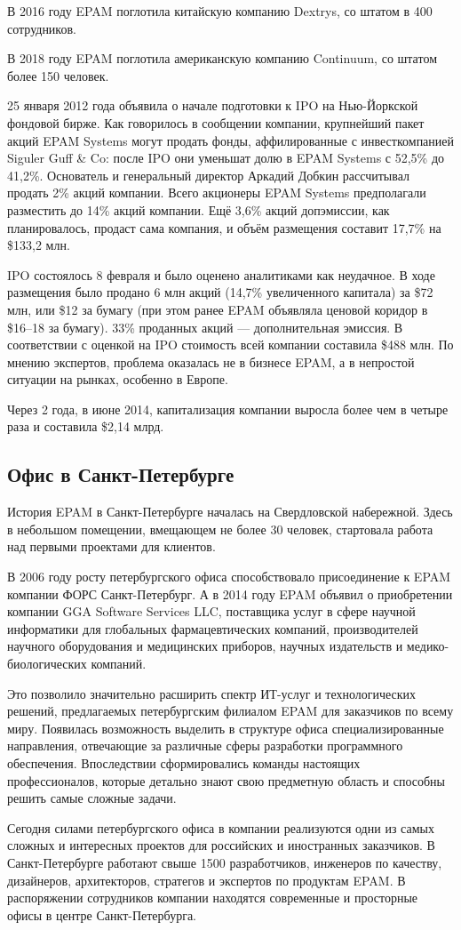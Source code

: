 В 2016 году EPAM поглотила китайскую компанию Dextrys, со штатом в 400 сотрудников.

В 2018 году EPAM поглотила американскую компанию Continuum, со штатом более 150 человек.

25 января 2012 года объявила о начале подготовки к IPO на Нью-Йоркской фондовой бирже. Как говорилось в сообщении компании, крупнейший пакет акций EPAM Systems могут продать фонды, аффилированные с инвесткомпанией Siguler Guff \& Co: после IPO они уменьшат долю в EPAM Systems с 52,5\% до 41,2\%. Основатель и генеральный директор Аркадий Добкин рассчитывал продать 2\% акций компании. Всего акционеры EPAM Systems предполагали разместить до 14\% акций компании. Ещё 3,6\% акций допэмиссии, как планировалось, продаст сама компания, и объём размещения составит 17,7\% на \$133,2 млн.

IPO состоялось 8 февраля и было оценено аналитиками как неудачное. В ходе размещения было продано 6 млн акций (14,7\% увеличенного капитала) за \$72 млн, или \$12 за бумагу (при этом ранее EPAM объявляла ценовой коридор в \$16–18 за бумагу). 33\% проданных акций — дополнительная эмиссия. В соответствии с оценкой на IPO стоимость всей компании составила \$488 млн. По мнению экспертов, проблема оказалась не в бизнесе EPAM, а в непростой ситуации на рынках, особенно в Европе.

Через 2 года, в июне 2014, капитализация компании выросла более чем в четыре раза и составила \$2,14 млрд.

\subsection{Офис в Санкт-Петербурге}

История EPAM в Санкт-Петербурге началась на Свердловской набережной. Здесь в небольшом помещении, вмещающем не более 30 человек, стартовала работа над первыми проектами для клиентов.

В 2006 году росту петербургского офиса способствовало присоединение к EPAM компании ФОРС Санкт-Петербург. А в 2014 году EPAM объявил о приобретении компании GGA Software Services LLC, поставщика услуг в сфере научной информатики для глобальных фармацевтических компаний, производителей научного оборудования и медицинских приборов, научных издательств и медико-биологических компаний.

Это позволило значительно расширить спектр ИТ-услуг и технологических решений, предлагаемых петербургским филиалом EPAM для заказчиков по всему миру. Появилась возможность выделить в структуре офиса специализированные направления, отвечающие за различные сферы разработки программного обеспечения. Впоследствии сформировались команды настоящих профессионалов, которые детально знают свою предметную область и способны решить самые сложные задачи.

Сегодня силами петербургского офиса в компании реализуются одни из самых сложных и интересных проектов для российских и иностранных заказчиков. В Санкт-Петербурге работают свыше 1500 разработчиков, инженеров по качеству, дизайнеров, архитекторов, стратегов и экспертов по продуктам EPAM. В распоряжении сотрудников компании находятся современные и просторные офисы в центре Санкт-Петербурга.